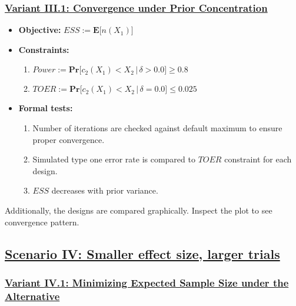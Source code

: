 \documentclass[
]{book}
\providecommand{\tightlist}{%
  \setlength{\itemsep}{0pt}\setlength{\parskip}{0pt}}
\begin{document}
\hypertarget{variant-iii.1-convergence-under-prior-concentration}{%
\subsubsection{\texorpdfstring{\protect\hyperlink{variantIII_1}{Variant III.1: Convergence under Prior Concentration}}{Variant III.1: Convergence under Prior Concentration}}\label{variant-iii.1-convergence-under-prior-concentration}}

\begin{itemize}
\tightlist
\item
  \textbf{Objective:} \(ESS := \boldsymbol{E}\big[n(X_1)\big]\)
\item
  \textbf{Constraints:}

  \begin{enumerate}
  \def\labelenumi{\arabic{enumi}.}
  \tightlist
  \item
    \(Power := \boldsymbol{Pr}\big[c_2(X_1) < X_2\,|\,\delta>0.0\big] \geq 0.8\)
  \item
    \(TOER := \boldsymbol{Pr}\big[c_2(X_1) < X_2\,|\,\delta=0.0\big] \leq 0.025\)
  \end{enumerate}
\item
  \textbf{Formal tests:}

  \begin{enumerate}
  \def\labelenumi{\arabic{enumi}.}
  \tightlist
  \item
    Number of iterations are checked against default maximum to ensure proper
    convergence.
  \item
    Simulated type one error rate is compared to \(TOER\) constraint for each
    design.
  \item
    \(ESS\) decreases with prior variance.
  \end{enumerate}
\end{itemize}

Additionally, the designs are compared graphically.
Inspect the plot to see convergence pattern.

\hypertarget{scenario-iv-smaller-effect-size-larger-trials}{%
\subsection{\texorpdfstring{\protect\hyperlink{scenarioIV}{Scenario IV: Smaller effect size, larger trials}}{Scenario IV: Smaller effect size, larger trials}}\label{scenario-iv-smaller-effect-size-larger-trials}}

\hypertarget{variant-iv.1-minimizing-expected-sample-size-under-the-alternative}{%
\subsubsection{\texorpdfstring{\protect\hyperlink{variantIV_1}{Variant IV.1: Minimizing Expected Sample Size under the Alternative}}{Variant IV.1: Minimizing Expected Sample Size under the Alternative}}\label{variant-iv.1-minimizing-expected-sample-size-under-the-alternative}}
\end{document}
